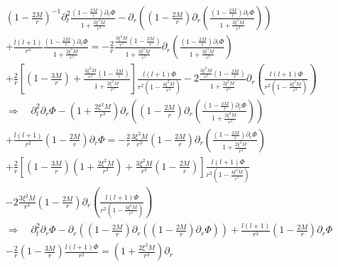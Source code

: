 \documentclass[12pt]{article}
\def\nn{\nonumber}
\begin{document}
\begin{gather}
(1 - \frac{2 M}{r})^{-1}
\partial^{2}_{t}
\frac{(1 - \frac{2 M}{r}) \partial_{r} \Phi}{1 + \frac{2 \xi^{2} M}{r^{3}}}
-
\partial_{r}
\left(
(1 - \frac{2 M}{r})
\partial_{r}
\left(
\frac{(1 - \frac{2 M}{r}) \partial_{r} \Phi}{1 + \frac{2 \xi^{2} M}{r^{3}}}
\right)
\right)
\nn \\
+
\frac{l (l + 1)}{r^{2}}
\frac{(1 - \frac{2 M}{r}) \partial_{r} \Phi}{1 + \frac{2 \xi^{2} M}{r^{3}}}
=
-
\frac{2}{r}
\frac{\frac{3 \xi^{2} M}{r^{3}} (1 - \frac{2 M}{r})}{1 + \frac{2 \xi^{2} M}{r^{3}}}
\partial_{r} 
\left(
\frac{(1 - \frac{2 M}{r}) \partial_{r} \Phi}{1 + \frac{2 \xi^{2} M}{r^{3}}}
\right)
\nn \\
+
\frac{2}{r}
\left[
(1 - \frac{3 M}{r})
+
\frac{\frac{3 \xi^{2} M}{r^{3}} (1 - \frac{2 M}{r}) }{1 + \frac{2 \xi^{2} M}{r^{3}}}
\right]
\frac{l (l +1) \Phi}{r^{2} (1 - \frac{4 \xi^{2} M}{r^{3}})}
-
2
\frac{\frac{3 \xi^{2} M}{r^{3}} (1 - \frac{2 M}{r})}{1 + \frac{2 \xi^{2} M}{r^{3}}}
\partial_{r}
\left(
\frac{l (l +1) \Phi}{r^{2} (1 - \frac{4 \xi^{2} M}{r^{3}})}
\right)
\nn \\
\Rightarrow
\quad
\partial^{2}_{t} \partial_{r} \Phi
-
(1 + \frac{2 \xi^{2} M}{r^{3}})
\partial_{r}
\left(
(1 - \frac{2 M}{r})
\partial_{r}
\left(
\frac{(1 - \frac{2 M}{r}) \partial_{r} \Phi}{1 + \frac{2 \xi^{2} M}{r^{3}}}
\right)
\right)
\nn \\
+
\frac{l (l + 1)}{r^{2}}
(1 - \frac{2 M}{r}) \partial_{r} \Phi
=
-
\frac{2}{r}
\frac{3 \xi^{2} M}{r^{3}} (1 - \frac{2 M}{r})
\partial_{r} 
\left(
\frac{(1 - \frac{2 M}{r}) \partial_{r} \Phi}{1 + \frac{2 \xi^{2} M}{r^{3}}}
\right)
\nn \\
+
\frac{2}{r}
\left[
(1 - \frac{3 M}{r})
(1 + \frac{2 \xi^{2} M}{r^{3}})
+
\frac{3 \xi^{2} M}{r^{3}} (1 - \frac{2 M}{r})
\right]
\frac{l (l +1) \Phi}{r^{2} (1 - \frac{4 \xi^{2} M}{r^{3}})}
\nn \\
-
2
\frac{3 \xi^{2} M}{r^{3}} (1 - \frac{2 M}{r})
\partial_{r}
\left(
\frac{l (l +1) \Phi}{r^{2} (1 - \frac{4 \xi^{2} M}{r^{3}})}
\right)
\nn \\
\Rightarrow
\quad
\partial^{2}_{t} \partial_{r} \Phi
-
\partial_{r}
\left(
(1 - \frac{2 M}{r})
\partial_{r}
\left(
(1 - \frac{2 M}{r}) \partial_{r} \Phi
\right)
\right)
+
\frac{l (l + 1)}{r^{2}}
(1 - \frac{2 M}{r}) \partial_{r} \Phi
\nn \\
-
\frac{2}{r}
(1 - \frac{3 M}{r})
\frac{l (l +1) \Phi}{r^{2}}
=
(1 + \frac{2 \xi^{2} M}{r^{3}})
\partial_{r}

\end{gather}
\end{document}
